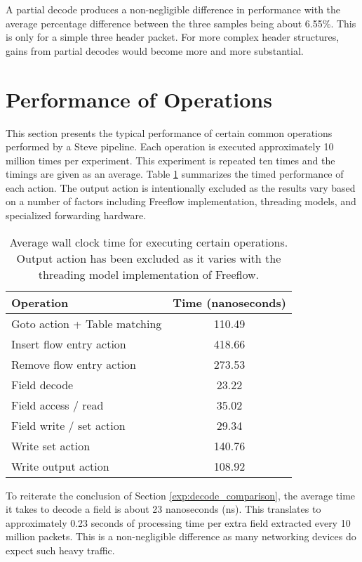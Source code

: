 A partial decode produces a non-negligible difference in performance with the average percentage difference between the three samples being about 6.55\%. This is only for a simple three header packet. For more complex header structures, gains from partial decodes would become more and more substantial.


\section{Performance of Operations} \label{exp:action_performance}

This section presents the typical performance of certain common operations performed by a Steve pipeline. Each operation is executed approximately 10 million times per experiment. This experiment is repeated ten times and the timings are given as an average. Table \ref{tbl:action_stats} summarizes the timed performance of each action. The output action is intentionally excluded as the results vary based on a number of factors including Freeflow implementation, threading models, and specialized forwarding hardware.

\begin{table}[ht]
\caption{Average wall clock time for executing certain operations. Output action has been excluded as it varies with the threading model implementation of Freeflow.}
\begin{center}
\begin{tabularx}{\linewidth}{| X || c | }
\hline
Operation & Time (nanoseconds)  \\
\hline
Goto action + Table matching & 110.49 \\
\hline
Insert flow entry action & 418.66 \\
\hline
Remove flow entry action & 273.53 \\
\hline
Field decode & 23.22 \\
\hline
Field access / read & 35.02 \\
\hline
Field write / set action & 29.34 \\
\hline
Write set action &  140.76 \\
\hline
Write output action & 108.92 \\
\hline
\end{tabularx}
\end{center}
\label{tbl:action_stats}
\end{table}

To reiterate the conclusion of Section \ref{exp:decode_comparison}, the average time it takes to decode a field is about 23 nanoseconds (ns). This translates to approximately 0.23 seconds of processing time per extra field extracted every 10 million packets. This is a non-negligible difference as many networking devices do expect such heavy traffic.

